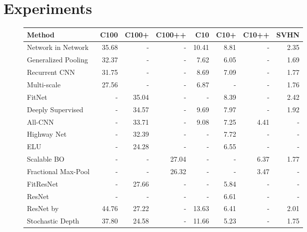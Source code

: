 \documentclass{article}
\newcommand{\Resnet}{ResNet}
\begin{document}
\section{Experiments}
\label{sec:results}
\begin{figure}
   \def\dash{-\phantom{00}}
\begin{small}
\begin{tabular}{@{}l|r:rr|r:rr|r}
Method                                                   & C100  & C100+ & C100++ & C10   & C10+  & C10++ & SVHN \\
\toprule
Network in Network~\citep{nin}                           & 35.68 & \dash & \dash  & 10.41 & 8.81  & \dash & 2.35 \\
Generalized Pooling~\citep{lee2016generalizing}          & 32.37 & \dash & \dash  & 7.62  & 6.05  & \dash & 1.69 \\ Recurrent CNN~\citep{liang2015recurrent}                 & 31.75 & \dash & \dash  & 8.69  & 7.09  & \dash & 1.77 \\ Multi-scale~\citep{liao2015competitive}                  & 27.56 & \dash & \dash  & 6.87  & \dash & \dash & 1.76 \\
FitNet~\cite{romero2014fitnets}                          & \dash & 35.04 & \dash  & \dash & 8.39  & \dash & 2.42 \\ Deeply Supervised~\citep{lee2014deeply}                  & \dash & 34.57 & \dash  & 9.69  & 7.97  & \dash & 1.92 \\
All-CNN~\citep{springenberg2014striving}                 & \dash & 33.71 & \dash  & 9.08  & 7.25  & 4.41  & \dash\\ Highway Net~\citep{srivastava2015highway}                & \dash & 32.39 & \dash  & \dash & 7.72  & \dash & \dash\\ ELU~\citep{elu}                                          & \dash & 24.28 & \dash  & \dash & 6.55  & \dash & \dash\\ Scalable BO~\citep{snoek2015scalable}                    & \dash & \dash & 27.04  & \dash & \dash & 6.37  & 1.77 \\ Fractional Max-Pool~\citep{graham2014fractional}         & \dash & \dash & 26.32  & \dash & \dash & 3.47  & \dash\\ \midrule
FitResNet~\citep{mishkin2015all}                         & \dash & 27.66 & \dash  & \dash & 5.84  & \dash & \dash\\ {\Resnet}~\citep{he2015deep}                             & \dash & \dash & \dash  & \dash & 6.61  & \dash & \dash\\ {\Resnet} by~\citep{huang2016stochasticdepth}            & 44.76 & 27.22 & \dash  & 13.63 & 6.41  & \dash & 2.01 \\ Stochastic Depth~\citep{huang2016stochasticdepth}        & 37.80 & 24.58 & \dash  & 11.66 & 5.23  & \dash & 1.75 \\

\end{tabular}
\end{small}
\end{figure}
\end{document}
